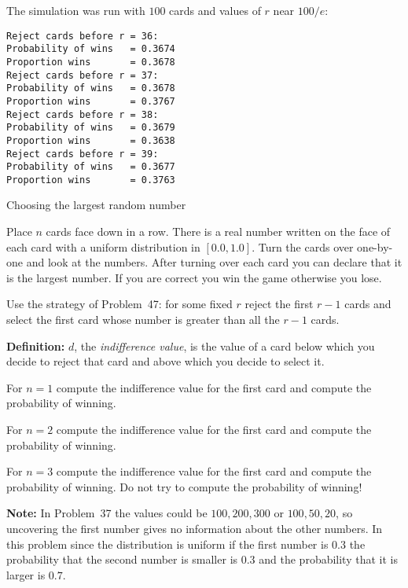 \sml{}
The simulation was run with $100$ cards and values of $r$ near $100/e$:
\begin{verbatim}
Reject cards before r = 36:
Probability of wins   = 0.3674
Proportion wins       = 0.3678
Reject cards before r = 37:
Probability of wins   = 0.3678
Proportion wins       = 0.3767
Reject cards before r = 38:
Probability of wins   = 0.3679
Proportion wins       = 0.3638
Reject cards before r = 39:
Probability of wins   = 0.3677
Proportion wins       = 0.3763
\end{verbatim}


\newpage

\begin{prob}{Choosing the largest random number}

Place $n$ cards face down in a row. There is a real number  written on the face of each card with a uniform distribution in $[0.0,1.0]$. Turn the cards over one-by-one and look at the numbers. After turning over each card you can declare that it is the largest number. If you are correct you win the game otherwise you lose. 

Use the strategy of Problem~47: for some fixed $r$ reject the first $r-1$ cards and select the first card whose number is greater than all the $r-1$ cards.

\textbf{Definition:} $d$, the \emph{indifference value}, is the value of a card below which you decide to reject that card and above which you decide to select it.

 For $n=1$ compute the indifference value for the first card and compute the probability of winning.

 For $n=2$ compute the indifference value for the first card and compute the probability of winning.

 For $n=3$ compute the indifference value for the first card and compute the probability of winning. Do not try to compute the probability of winning!

\textbf{Note:} In Problem~37 the values could be $100, 200, 300$ or $100, 50, 20$, so uncovering the first number gives no information about the other numbers. In this problem since the distribution is uniform if the first number is $0.3$ the probability that the second number is smaller is $0.3$ and the probability that it is larger is $0.7$.
\end{prob}

\solution{}

